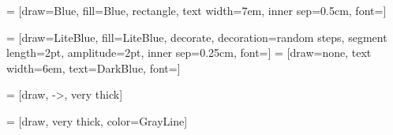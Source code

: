 


 = [draw=Blue, 
                     fill=Blue, 
                     rectangle, 
                     text width=7em, 
                     inner sep=0.5cm, 
                     font=\large]

 = [draw=LiteBlue, 
                       fill=LiteBlue, 
                       decorate,
                       decoration={random steps,
                                   segment length=2pt,
                                   amplitude=2pt},
                       inner sep=0.25cm, 
                       font=\normalsize]
 = [draw=none, 
                          text width=6em,
                          text=DarkBlue,
                          font=\large]
                          
 = [draw,
                    ->,
                    very thick]    
                    
 = [draw,
                        very thick,
                        color=GrayLine]

